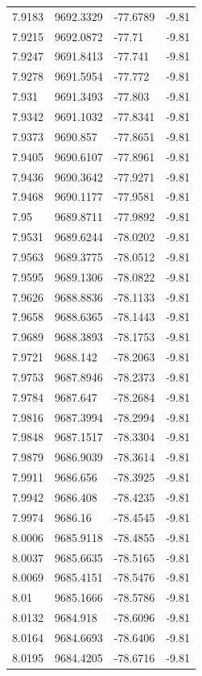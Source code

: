 \begin{table}[H]
\begin{tabular}{llll}
7.9183 & 9692.3329 & -77.6789 & -9.81 \\
7.9215 & 9692.0872 & -77.71 & -9.81 \\
7.9247 & 9691.8413 & -77.741 & -9.81 \\
7.9278 & 9691.5954 & -77.772 & -9.81 \\
7.931 & 9691.3493 & -77.803 & -9.81 \\
7.9342 & 9691.1032 & -77.8341 & -9.81 \\
7.9373 & 9690.857 & -77.8651 & -9.81 \\
7.9405 & 9690.6107 & -77.8961 & -9.81 \\
7.9436 & 9690.3642 & -77.9271 & -9.81 \\
7.9468 & 9690.1177 & -77.9581 & -9.81 \\
7.95 & 9689.8711 & -77.9892 & -9.81 \\
7.9531 & 9689.6244 & -78.0202 & -9.81 \\
7.9563 & 9689.3775 & -78.0512 & -9.81 \\
7.9595 & 9689.1306 & -78.0822 & -9.81 \\
7.9626 & 9688.8836 & -78.1133 & -9.81 \\
7.9658 & 9688.6365 & -78.1443 & -9.81 \\
7.9689 & 9688.3893 & -78.1753 & -9.81 \\
7.9721 & 9688.142 & -78.2063 & -9.81 \\
7.9753 & 9687.8946 & -78.2373 & -9.81 \\
7.9784 & 9687.647 & -78.2684 & -9.81 \\
7.9816 & 9687.3994 & -78.2994 & -9.81 \\
7.9848 & 9687.1517 & -78.3304 & -9.81 \\
7.9879 & 9686.9039 & -78.3614 & -9.81 \\
7.9911 & 9686.656 & -78.3925 & -9.81 \\
7.9942 & 9686.408 & -78.4235 & -9.81 \\
7.9974 & 9686.16 & -78.4545 & -9.81 \\
8.0006 & 9685.9118 & -78.4855 & -9.81 \\
8.0037 & 9685.6635 & -78.5165 & -9.81 \\
8.0069 & 9685.4151 & -78.5476 & -9.81 \\
8.01 & 9685.1666 & -78.5786 & -9.81 \\
8.0132 & 9684.918 & -78.6096 & -9.81 \\
8.0164 & 9684.6693 & -78.6406 & -9.81 \\
8.0195 & 9684.4205 & -78.6716 & -9.81 \\

\end{tabular}
\end{table}
